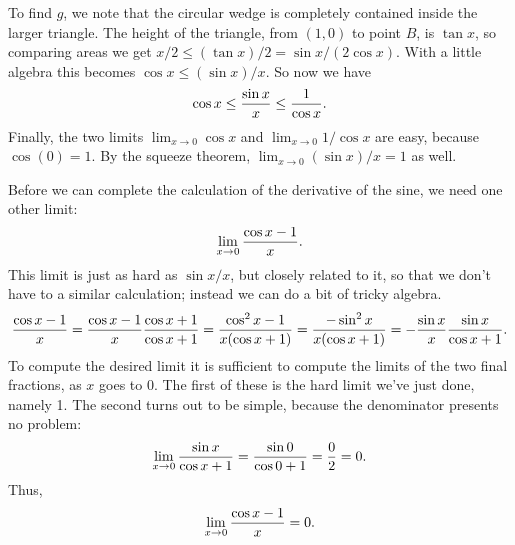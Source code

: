 
To find $g$, we note that the circular wedge is completely contained
inside the larger triangle. The height of the triangle, from $(1,0)$
to point $B$, is $\tan x$, so comparing areas we get
$x/2 \le (\tan x)/2 = \sin x / (2\cos x)$. With a little algebra this
becomes $\cos x \le (\sin x)/x$. So now we have 
$$ \cos x \le {\sin x\over x}\le {1\over\cos x}.$$
Finally, the two limits $\lim_{x\to0}\cos x$ and $\lim_{x\to0}1/\cos x$
are easy, because $\cos(0)=1$. By the squeeze theorem,
$\lim_{x\to0} (\sin x)/x = 1$ as well.

Before we can complete the calculation of the derivative of the sine,
we need one other limit:
$$\lim_{x\to0}{\cos x - 1\over x}.$$
This limit is just as hard as $\sin x/x$, but closely related to it,
so that we don't have to a similar calculation; instead we can do a
bit of tricky algebra.
$${\cos x - 1\over x}={\cos x - 1\over x}{\cos x+1\over\cos x+1}
={\cos^2 x - 1\over x(\cos x+1)}={-\sin^2 x\over x(\cos x+1)}=
-{\sin x\over x}{\sin x\over \cos x + 1}.$$
To compute the desired limit it is sufficient to compute the limits of
the two final fractions, as $x$ goes to 0. The first of these is the
hard limit we've just done, namely 1. The second turns out to be
simple, because the denominator presents no problem:
$$\lim_{x\to0}{\sin x\over \cos x + 1}={\sin 0\over \cos 0+1}=
{0\over 2}  = 0.$$
Thus,
$$\lim_{x\to0}{\cos x - 1\over x}=0.$$

